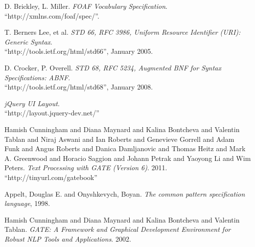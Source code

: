 \begin{thebibliography}{9}
D. Brickley, L. Miller.
  \emph{FOAF Vocabulary Specification}.\\
  ``http://xmlns.com/foaf/spec/''.

T. Berners Lee, et al.
  \emph{STD 66, RFC 3986, Uniform Resource Identifier (URI): Generic
    Syntax}.\\
  ``http://tools.ietf.org/html/std66'', January 2005.

D. Crocker, P. Overell.
  \emph{STD 68, RFC 5234, Augmented BNF for Syntax Specifications: ABNF}.\\
  ``http://tools.ietf.org/html/std68'', January 2008.

 \emph{jQuery UI Layout}.\\
  ``http://layout.jquery-dev.net/''

Hamish Cunningham and Diana Maynard and Kalina Bontcheva and Valentin Tablan and Niraj Aswani and Ian Roberts and Genevieve Gorrell and Adam Funk and Angus Roberts and Danica Damljanovic and Thomas Heitz and Mark A. Greenwood and Horacio Saggion and Johann Petrak and Yaoyong Li and Wim Peters.
 \emph{Text Processing with GATE (Version 6)}. 2011.\\
 ``http://tinyurl.com/gatebook''

Appelt, Douglas E. and Onyshkevych, Boyan.
 \emph{The common pattern specification language}, 1998.

Hamish Cunningham and Diana Maynard and Kalina Bontcheva and Valentin Tablan.
\emph{GATE: A Framework and Graphical Development Environment for Robust NLP Tools and Applications}. 2002.

\end{thebibliography}
